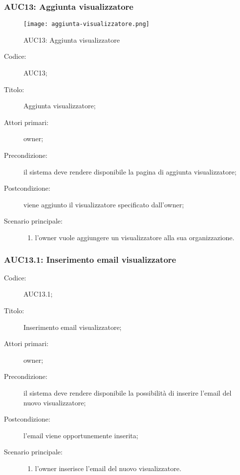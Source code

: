 \documentclass[../../../analisi-dei-requisiti.tex]{subfiles}
\begin{document}
\subsubsection{AUC13: Aggiunta visualizzatore}%
\label{subs:AUC13}

\begin{figure}[H]
  \centering
  \texttt{[image: aggiunta-visualizzatore.png]}
  \caption{AUC13: Aggiunta visualizzatore}%
  \label{fig:AUC13}
\end{figure}

\begin{description}
  \item[Codice:] AUC13;
  \item[Titolo:] Aggiunta visualizzatore;
  \item[Attori primari:] owner;
  \item[Precondizione:] il sistema deve rendere disponibile la pagina di aggiunta visualizzatore;
  \item[Postcondizione:] viene aggiunto il visualizzatore specificato dall'owner;
  \item[Scenario principale:]
  \begin{enumerate}
    \item l'owner vuole aggiungere un visualizzatore alla sua organizzazione.
  \end{enumerate}
\end{description}

\subsubsection{AUC13.1: Inserimento email visualizzatore}%
\label{subs:AUC13.1}
\begin{description}
  \item[Codice:] AUC13.1;
  \item[Titolo:] Inserimento email visualizzatore;
  \item[Attori primari:] owner;
  \item[Precondizione:] il sistema deve rendere disponibile la possibilità di inserire l'email del nuovo visualizzatore;
  \item[Postcondizione:] l'email viene opportunemente inserita;
  \item[Scenario principale:]
  \begin{enumerate}
    \item l'owner inserisce l'email del nuovo visualizzatore.
  \end{enumerate}
\end{description}
\end{document}
